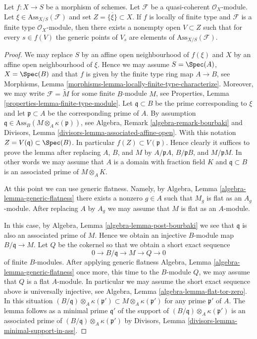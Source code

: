 \begin{lemma}
\label{lemma-relative-assassin-in-neighbourhood}
Let $f : X \to S$ be a morphism of schemes.
Let $\mathcal{F}$ be a quasi-coherent $\mathcal{O}_X$-module.
Let $\xi \in \text{Ass}_{X/S}(\mathcal{F})$ and set
$Z = \overline{\{\xi\}} \subset X$.
If $f$ is locally of finite type and $\mathcal{F}$ is a
finite type $\mathcal{O}_X$-module, then there exists a nonempty
open $V \subset Z$ such that for every $s \in f(V)$ the generic
points of $V_s$ are elements of $\text{Ass}_{X/S}(\mathcal{F})$.
\end{lemma}

\begin{proof}
We may replace $S$ by an affine open neighbourhood of $f(\xi)$
and $X$ by an affine open neighbourhood of $\xi$. Hence we may assume
$S = \Spec(A)$, $X = \Spec(B)$ and that $f$ is given by
the finite type ring map $A \to B$, see
Morphisms, Lemma \ref{morphisms-lemma-locally-finite-type-characterize}.
Moreover, we may write $\mathcal{F} = \widetilde{M}$ for some finite
$B$-module $M$, see
Properties, Lemma \ref{properties-lemma-finite-type-module}.
Let $\mathfrak q \subset B$ be the prime corresponding to $\xi$ and
let $\mathfrak p \subset A$ be the corresponding prime of $A$.
By assumption $\mathfrak q \in \text{Ass}_B(M \otimes_A \kappa(\mathfrak p))$,
see
Algebra, Remark \ref{algebra-remark-bourbaki}
and
Divisors, Lemma \ref{divisors-lemma-associated-affine-open}.
With this notation $Z = V(\mathfrak q) \subset \Spec(B)$.
In particular $f(Z) \subset V(\mathfrak p)$. Hence clearly it suffices to
prove the lemma after replacing $A$, $B$, and $M$ by
$A/\mathfrak pA$, $B/\mathfrak pB$, and $M/\mathfrak pM$.
In other words we may assume that $A$ is a domain with fraction field
$K$ and $\mathfrak q \subset B$ is an associated prime of $M \otimes_A K$.

\medskip\noindent
At this point we can use generic flatness. Namely, by
Algebra, Lemma \ref{algebra-lemma-generic-flatness}
there exists a nonzero $g \in A$ such that $M_g$ is flat
as an $A_g$-module. After replacing $A$ by $A_g$ we may assume that
$M$ is flat as an $A$-module.

\medskip\noindent
In this case, by
Algebra, Lemma \ref{algebra-lemma-post-bourbaki}
we see that $\mathfrak q$ is also an associated prime of $M$.
Hence we obtain an injective $B$-module map $B/\mathfrak q \to M$.
Let $Q$ be the cokernel so that we obtain a short exact sequence
$$
0 \to B/\mathfrak q \to M \to Q \to 0
$$
of finite $B$-modules. After applying generic flatness
Algebra, Lemma \ref{algebra-lemma-generic-flatness}
once more, this time to the $B$-module $Q$, we may assume that $Q$
is a flat $A$-module. In particular we may assume the short exact
sequence above is universally injective, see
Algebra, Lemma \ref{algebra-lemma-flat-tor-zero}.
In this situation
$(B/\mathfrak q) \otimes_A \kappa(\mathfrak p')
\subset M \otimes_A \kappa(\mathfrak p')$
for any prime $\mathfrak p'$ of $A$. The lemma follows as a minimal
prime $\mathfrak q'$ of the support of
$(B/\mathfrak q) \otimes_A \kappa(\mathfrak p')$
is an associated prime of $(B/\mathfrak q) \otimes_A \kappa(\mathfrak p')$ by
Divisors, Lemma \ref{divisors-lemma-minimal-support-in-ass}.
\end{proof}